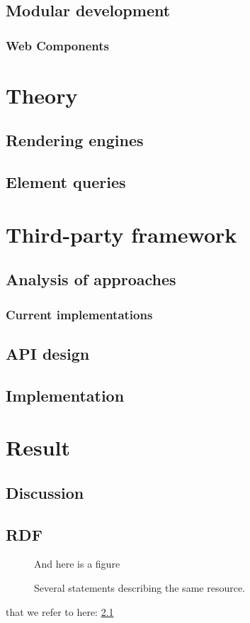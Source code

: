 \documentclass[a4paper,11pt]{kth-mag}
\begin{document}
    \chapter{Modular development}
      \section{Web Components}
  \part{Theory}
    \chapter{Rendering engines}
    \chapter{Element queries}
  \part{Third-party framework}
    \chapter{Analysis of approaches}
    \section{Current implementations}
    \chapter{API design}
    \chapter{Implementation}
  \part{Result}
    \chapter{Discussion}
  \printbibliography
  \appendix
  \addappheadtotoc
  \chapter{RDF}\label{appA}
    \begin{figure}[ht]
      \begin{center}
        And here is a figure
        \caption{\small{Several statements describing the same resource.}}\label{RDF_4}
      \end{center}
    \end{figure}
  that we refer to here: \ref{RDF_4}
\end{document}
